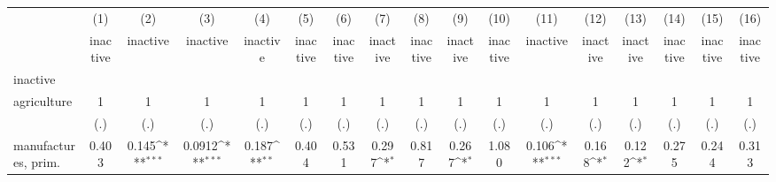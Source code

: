 {
\def\sym#1{\ifmmode^{#1}\else\(^{#1}\)\fi}
\begin{tabular}{l*{16}{c}}
\hline\hline
                    &\multicolumn{1}{c}{(1)}&\multicolumn{1}{c}{(2)}&\multicolumn{1}{c}{(3)}&\multicolumn{1}{c}{(4)}&\multicolumn{1}{c}{(5)}&\multicolumn{1}{c}{(6)}&\multicolumn{1}{c}{(7)}&\multicolumn{1}{c}{(8)}&\multicolumn{1}{c}{(9)}&\multicolumn{1}{c}{(10)}&\multicolumn{1}{c}{(11)}&\multicolumn{1}{c}{(12)}&\multicolumn{1}{c}{(13)}&\multicolumn{1}{c}{(14)}&\multicolumn{1}{c}{(15)}&\multicolumn{1}{c}{(16)}\\
                    &\multicolumn{1}{c}{inactive}&\multicolumn{1}{c}{inactive}&\multicolumn{1}{c}{inactive}&\multicolumn{1}{c}{inactive}&\multicolumn{1}{c}{inactive}&\multicolumn{1}{c}{inactive}&\multicolumn{1}{c}{inactive}&\multicolumn{1}{c}{inactive}&\multicolumn{1}{c}{inactive}&\multicolumn{1}{c}{inactive}&\multicolumn{1}{c}{inactive}&\multicolumn{1}{c}{inactive}&\multicolumn{1}{c}{inactive}&\multicolumn{1}{c}{inactive}&\multicolumn{1}{c}{inactive}&\multicolumn{1}{c}{inactive}\\
\hline
inactive            &                     &                     &                     &                     &                     &                     &                     &                     &                     &                     &                     &                     &                     &                     &                     &                     \\
agriculture         &           1         &           1         &           1         &           1         &           1         &           1         &           1         &           1         &           1         &           1         &           1         &           1         &           1         &           1         &           1         &           1         \\
                    &         (.)         &         (.)         &         (.)         &         (.)         &         (.)         &         (.)         &         (.)         &         (.)         &         (.)         &         (.)         &         (.)         &         (.)         &         (.)         &         (.)         &         (.)         &         (.)         \\
[1em]
manufactures, prim. &       0.403         &       0.145\sym{***}&      0.0912\sym{***}&       0.187\sym{**} &       0.404         &       0.531         &       0.297\sym{*}  &       0.817         &       0.267\sym{*}  &       1.080         &       0.106\sym{***}&       0.168\sym{*}  &       0.122\sym{*}  &       0.275         &       0.244         &       0.313         \\

\end{tabular}}
